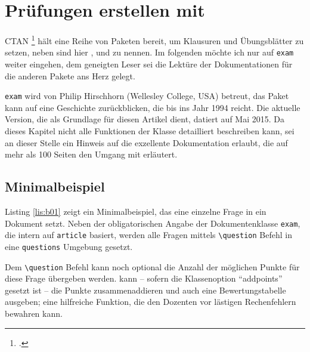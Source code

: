 \chapter{Prüfungen erstellen mit \protect{}}


CTAN%
\footcite[Vgl. ]{ziegenhagen:dtk2016/2} 
hält eine Reihe von Paketen bereit, um Klausuren und Übungsblätter zu setzen, neben  sind hier ,  und  zu nennen. 
Im folgenden möchte ich nur auf \texttt{exam} weiter eingehen, dem geneigten Leser sei die Lektüre der Dokumentationen für die anderen Pakete ans Herz gelegt.

\texttt{exam} wird von Philip Hirschhorn (Wellesley College, USA) betreut, das Paket kann auf eine Geschichte zurückblicken, die bis ins Jahr 1994 reicht. 
Die aktuelle Version, die als Grundlage für diesen Artikel dient, datiert auf Mai 2015. 
Da dieses Kapitel nicht alle Funktionen der Klasse detailliert beschreiben kann, sei an dieser Stelle ein Hinweis auf die exzellente Dokumentation erlaubt, die auf mehr als 100 Seiten den Umgang mit  erläutert.

\section{Minimalbeispiel}

Listing \ref{lis:b01} zeigt ein Minimalbeispiel, das eine einzelne Frage in ein Dokument setzt. 
Neben der obligatorischen Angabe der Dokumentenklasse \texttt{exam}, die intern auf \texttt{article} basiert, werden alle Fragen mittels \texttt{\textbackslash question} Befehl in eine \texttt{questions} Umgebung gesetzt. 


Dem  \texttt{\textbackslash question} Befehl kann noch optional die Anzahl der möglichen Punkte für diese Frage übergeben werden. 
 kann -- sofern die Klassenoption \enquote{addpoints} gesetzt ist -- die Punkte zusammenaddieren und auch eine Bewertungstabelle ausgeben; eine hilfreiche Funktion, die den Dozenten vor lästigen Rechenfehlern bewahren kann.

